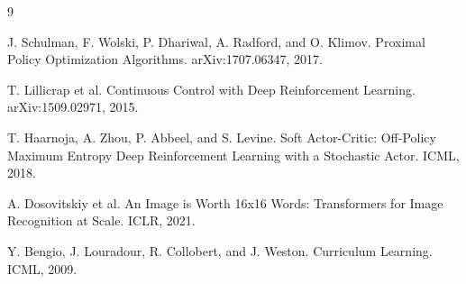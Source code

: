 \documentclass[twocolumn,a4paper,10pt]{article}
\begin{document}
\begin{thebibliography}{9}
\small

J. Schulman, F. Wolski, P. Dhariwal, A. Radford, and O. Klimov.
\newblock Proximal Policy Optimization Algorithms.
\newblock arXiv:1707.06347, 2017.

T. Lillicrap et al.
\newblock Continuous Control with Deep Reinforcement Learning.
\newblock arXiv:1509.02971, 2015.

T. Haarnoja, A. Zhou, P. Abbeel, and S. Levine.
\newblock Soft Actor-Critic: Off-Policy Maximum Entropy Deep Reinforcement
Learning with a Stochastic Actor.
\newblock ICML, 2018.

A. Dosovitskiy et al.
\newblock An Image is Worth 16x16 Words: Transformers for Image Recognition
at Scale.
\newblock ICLR, 2021.

Y. Bengio, J. Louradour, R. Collobert, and J. Weston.
\newblock Curriculum Learning.
\newblock ICML, 2009.

\end{thebibliography}
\end{document}
